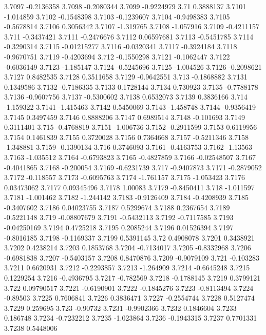 3.7097  -0.2136358
3.7098  -0.2080344
3.7099  -0.9224979
3.71  0.3888137
3.7101  -1.014859
3.7102  -0.1548398
3.7103  -0.1239607
3.7104  -0.9498383
3.7105  -0.5678814
3.7106  0.3056342
3.7107  -1.319765
3.7108  -1.057916
3.7109  -0.4211157
3.711  -0.3437421
3.7111  -0.2476676
3.7112  0.06597681
3.7113  -0.5451785
3.7114  -0.3290314
3.7115  -0.01215277
3.7116  -0.0320341
3.7117  -0.3924184
3.7118  -0.9670751
3.7119  -0.4203694
3.712  -0.1550298
3.7121  -0.1062447
3.7122  -0.6036149
3.7123  -1.185147
3.7124  -0.5245696
3.7125  -1.004526
3.7126  -0.2098621
3.7127  0.8482535
3.7128  0.3511658
3.7129  -0.9642551
3.713  -0.1868882
3.7131  0.1349586
3.7132  -0.7186335
3.7133  0.1728144
3.7134  0.730923
3.7135  -0.7788178
3.7136  -0.9607756
3.7137  -0.5300602
3.7138  0.6532073
3.7139  0.3836166
3.714  -1.159322
3.7141  -1.415463
3.7142  0.5450069
3.7143  -1.458748
3.7144  -0.9356419
3.7145  0.3497459
3.7146  0.8888206
3.7147  0.6989514
3.7148  -0.101693
3.7149  0.3111401
3.715  -0.4768819
3.7151  -1.006736
3.7152  -0.2911599
3.7153  0.6119956
3.7154  0.1461839
3.7155  0.3720028
3.7156  0.7364668
3.7157  -0.5211346
3.7158  -1.348881
3.7159  -0.1390134
3.716  0.3746093
3.7161  -0.4163753
3.7162  -1.13563
3.7163  -1.035512
3.7164  -0.6793823
3.7165  -0.4827859
3.7166  -0.02548507
3.7167  -0.4041865
3.7168  -0.200054
3.7169  -0.6231739
3.717  -0.9407873
3.7171  -0.2879052
3.7172  -0.118557
3.7173  -0.6095763
3.7174  -1.761157
3.7175  -1.053423
3.7176  0.03473062
3.7177  0.09345496
3.7178  1.00083
3.7179  -0.8450411
3.718  -1.011597
3.7181  -1.001462
3.7182  -1.244142
3.7183  -0.9126409
3.7184  -0.4208939
3.7185  -0.3407602
3.7186  0.04023755
3.7187  0.5299674
3.7188  0.2367654
3.7189  -0.5221148
3.719  -0.08807679
3.7191  -0.5432113
3.7192  -0.7117585
3.7193  -0.04250169
3.7194  0.4725218
3.7195  0.2085244
3.7196  0.01526394
3.7197  -0.8016185
3.7198  -0.1169337
3.7199  0.5391145
3.72  0.4908078
3.7201  0.3438921
3.7202  0.4238214
3.7203  0.1853768
3.7204  -0.7134017
3.7205  -0.8332968
3.7206  -0.6981838
3.7207  -0.5403157
3.7208  0.8470876
3.7209  -0.9079109
3.721  -0.103283
3.7211  0.6620931
3.7212  -0.2293857
3.7213  -1.264909
3.7214  -0.6645248
3.7215  0.1229254
3.7216  -0.4936795
3.7217  -0.782569
3.7218  -0.1788145
3.7219  0.3799121
3.722  0.09790517
3.7221  -0.6190901
3.7222  -0.1845276
3.7223  -0.8113494
3.7224  -0.89503
3.7225  0.7606841
3.7226  0.3836471
3.7227  -0.2554744
3.7228  0.5127474
3.7229  0.259695
3.723  -0.90732
3.7231  -0.9902366
3.7232  0.1846604
3.7233  0.186748
3.7234  -0.7232212
3.7235  -1.023864
3.7236  -0.1943315
3.7237  0.7701331
3.7238  0.5448006

